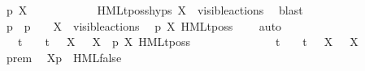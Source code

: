 \begin{isabellebody}
\ {\isacartoucheopen}p{\isacharprime}{\kern0pt}\ {\isasymTTurnstile}{\isacharbrackleft}{\kern0pt}X{\isacharbrackright}{\kern0pt}\ {\isasymphi}{\isacartoucheclose}\ \isanewline
\ \ \ \ \ \ \ \ \isamarkupfalse%
\ HMLt{\isacharunderscore}{\kern0pt}poss{\isachardot}{\kern0pt}hyps\ {\isacartoucheopen}X\ {\isasymsubseteq}\ visible{\isacharunderscore}{\kern0pt}actions{\isacartoucheclose}\ \isamarkupfalse%
\ blast\isanewline
\ \ \ \ \ \ \isamarkupfalse%
\ {\isacartoucheopen}p\ {\isasymlongmapsto}{\isasymtau}\ p{\isacharprime}{\kern0pt}{\isacartoucheclose}\ {\isacartoucheopen}{\isasymalpha}\ {\isacharequal}{\kern0pt}\ {\isasymtau}{\isacartoucheclose}\ {\isacartoucheopen}X\ {\isasymsubseteq}\ visible{\isacharunderscore}{\kern0pt}actions{\isacartoucheclose}\ \isamarkupfalse%
\ {\isacartoucheopen}p\ {\isasymTTurnstile}{\isacharbrackleft}{\kern0pt}X{\isacharbrackright}{\kern0pt}\ HMLt{\isacharunderscore}{\kern0pt}poss\ {\isasymalpha}\ {\isasymphi}{\isacartoucheclose}\ \isamarkupfalse%
\ auto\isanewline
\ \ \ \ \isamarkupfalse%
\isanewline
\ \ \ \ \isamarkupfalse%
\ \isamarkupfalse%
\ {\isacartoucheopen}{\isasymalpha}\ {\isacharequal}{\kern0pt}\ t\ {\isasymor}\ {\isasymalpha}\ {\isacharequal}{\kern0pt}\ t{\isacharunderscore}{\kern0pt}{\isasymepsilon}\ {\isasymor}\ {\isacharparenleft}{\kern0pt}{\isasymexists}\ X{\isachardot}{\kern0pt}\ {\isasymalpha}\ {\isacharequal}{\kern0pt}\ {\isasymepsilon}{\isacharbrackleft}{\kern0pt}X{\isacharbrackright}{\kern0pt}{\isacharparenright}{\kern0pt}\ {\isasymLongrightarrow}\ p\ {\isasymTTurnstile}{\isacharbrackleft}{\kern0pt}X{\isacharbrackright}{\kern0pt}\ HMLt{\isacharunderscore}{\kern0pt}poss\ {\isasymalpha}\ {\isasymphi}{\isacartoucheclose}\ \isamarkupfalse%
\ {\isacharminus}{\kern0pt}\isanewline
\ \ \ \ \ \ \isamarkupfalse%
\ {\isacartoucheopen}{\isasymalpha}\ {\isacharequal}{\kern0pt}\ t\ {\isasymor}\ {\isasymalpha}\ {\isacharequal}{\kern0pt}\ t{\isacharunderscore}{\kern0pt}{\isasymepsilon}\ {\isasymor}\ {\isacharparenleft}{\kern0pt}{\isasymexists}\ X{\isachardot}{\kern0pt}\ {\isasymalpha}\ {\isacharequal}{\kern0pt}\ {\isasymepsilon}{\isacharbrackleft}{\kern0pt}X{\isacharbrackright}{\kern0pt}{\isacharparenright}{\kern0pt}{\isacartoucheclose}\isanewline
\ \ \ \ \ \ \isamarkupfalse%
\ prem\ \isamarkupfalse%
\ {\isacartoucheopen}{\isasymtheta}{\isacharbrackleft}{\kern0pt}X{\isacharbrackright}{\kern0pt}{\isacharparenleft}{\kern0pt}p{\isacharparenright}{\kern0pt}\ {\isasymTurnstile}\ HML{\isacharunderscore}{\kern0pt}false{\isacartoucheclose}\ \isamarkupfalse%

\end{isabellebody}
